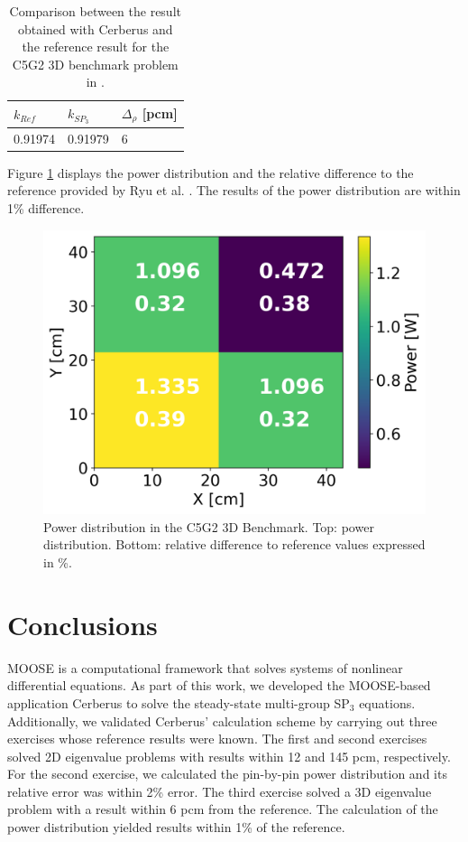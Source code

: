 \documentclass{anstrans}
\begin{document}
\begin{table}[htbp!]
    \centering
    \caption{Comparison between the result obtained with Cerberus and the reference result for the C5G2 3D benchmark problem in \cite{ryu_finite_2013}.}
    \label{tab:keff-4th}
    \begin{tabular}{lll}
    \toprule
        $k_{Ref}$   & $k_{SP_3}$    & $\Delta_{\rho}$ [pcm]   \\
    \midrule
        0.91974     & 0.91979       & 6                 \\
    \bottomrule
    \end{tabular}
\end{table}

Figure \ref{fig:c5g2-3d-power} displays the power distribution and the relative
difference to the reference provided by Ryu et al. \cite{ryu_finite_2013}.
The results of the power distribution are within 1\% difference.

\begin{figure}[h] %
    \centering
    \includegraphics[width=0.65\linewidth]{figures/C5G23D-distrib.png}
    \hfill
    \caption{Power distribution in the C5G2 3D Benchmark. Top: power distribution. Bottom: relative difference to reference values expressed in \%.}
    \label{fig:c5g2-3d-power}
\end{figure}


\section{Conclusions}

MOOSE is a computational framework that solves systems of nonlinear differential equations.
As part of this work, we developed the MOOSE-based application Cerberus to solve the steady-state multi-group SP$_3$ equations.
Additionally, we validated Cerberus' calculation scheme by carrying out three exercises whose reference results were known.
The first and second exercises solved 2D eigenvalue problems with results within 12 and 145 pcm, respectively.
For the second exercise, we calculated the pin-by-pin power distribution and its relative error was within 2\% error.
The third exercise solved a 3D eigenvalue problem with a result within 6 pcm from the reference.
The calculation of the power distribution yielded results within 1\% of the reference.
\end{document}
